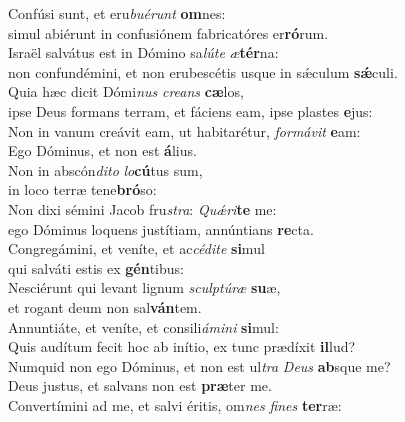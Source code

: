 \evenverse Confúsi sunt, et eru\textit{bu}\textit{é}\textit{runt} \textbf{om}nes:~\*\\
\evenverse simul abiérunt in confusiónem fabricatóres er\textbf{ró}rum.\\
\oddverse Israël salvátus est in Dómino sa\textit{lú}\textit{te} \textit{æ}\textbf{tér}na:~\*\\
\oddverse non confundémini, et non erubescétis usque in sǽculum \textbf{sǽ}culi.\\
\evenverse Quia hæc dicit Dómi\textit{nus} \textit{cre}\textit{ans} \textbf{cæ}los,~\*\\
\evenverse ipse Deus formans terram, et fáciens eam, ipse plastes \textbf{e}jus:\\
\oddverse Non in vanum creávit eam, ut habitarétur, \textit{for}\textit{má}\textit{vit} \textbf{e}am:~\*\\
\oddverse Ego Dóminus, et non est \textbf{á}lius.\\
\evenverse Non in abscón\textit{di}\textit{to} \textit{lo}\textbf{cú}tus sum,~\*\\
\evenverse in loco terræ tene\textbf{bró}so:\\
\oddverse Non dixi sémini Jacob fru\textit{stra}: \textit{Quǽ}\textit{ri}\textbf{te} me:~\*\\
\oddverse ego Dóminus loquens justítiam, annúntians \textbf{re}cta.\\
\evenverse Congregámini, et veníte, et ac\textit{cé}\textit{di}\textit{te} \textbf{si}mul~\*\\
\evenverse qui salváti estis ex \textbf{gén}tibus:\\
\oddverse Nesciérunt qui levant lignum \textit{scul}\textit{ptú}\textit{ræ} \textbf{su}æ,~\*\\
\oddverse et rogant deum non sal\textbf{ván}tem.\\
\evenverse Annuntiáte, et veníte, et consili\textit{á}\textit{mi}\textit{ni} \textbf{si}mul:~\*\\
\evenverse Quis audítum fecit hoc ab inítio, ex tunc prædíxit \textbf{il}lud?\\
\oddverse Numquid non ego Dóminus, et non est ul\textit{tra} \textit{De}\textit{us} \textbf{ab}sque me?~\*\\
\oddverse Deus justus, et salvans non est \textbf{præ}ter me.\\
\evenverse Convertímini ad me, et salvi éritis, om\textit{nes} \textit{fi}\textit{nes} \textbf{ter}ræ:~\*\\
